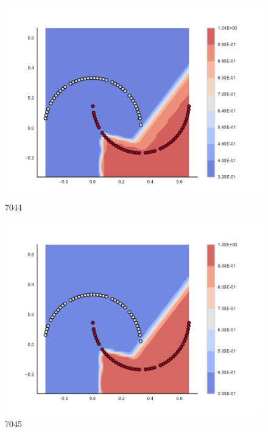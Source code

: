\begin{subfigure}[b]{0.09\textwidth}
    \includegraphics[clip, trim=2.35cm 1.75cm 4.5cm 0cm,width=\textwidth]{img/convergence/7044.pdf}
    \caption{7044}
    \label{fig:convergence_7044}
\end{subfigure}
%
\begin{subfigure}[b]{0.09\textwidth}
    \includegraphics[clip, trim=2.35cm 1.75cm 4.5cm 0cm,width=\textwidth]{img/convergence/7045.pdf}
    \caption{7045}
    \label{fig:convergence_7045}
\end{subfigure}
%
